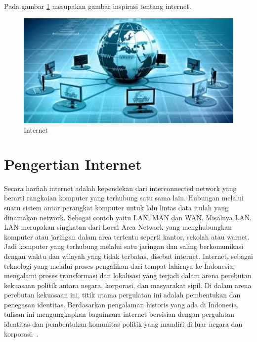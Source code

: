 
Pada gambar \ref{labelgambar} merupakan gambar inspirasi tentang internet.
\begin{figure}[ht]
\centerline{\includegraphics[width=1\textwidth]{figures/1internet.JPG}}
\caption{Internet}
\label{labelgambar}
\end{figure}

\section{Pengertian Internet}
\paragraph{} Secara harfiah internet adalah kependekan dari interconnected network yang berarti rangkaian komputer yang terhubung satu sama lain. Hubungan melalui suatu sistem antar perangkat komputer untuk lalu lintas data itulah yang dinamakan network. Sebagai contoh yaitu LAN, MAN dan WAN. Misalnya LAN. LAN merupakan singkatan dari Local Area Network yang menghubungkan komputer atau jaringan dalam area tertentu seperti kantor, sekolah atau warnet. Jadi komputer yang terhubung melalui satu jaringan dan saling berkomunikasi dengan waktu dan wilayah yang tidak terbatas, disebut internet.
Internet, sebagai teknologi yang melalui proses pengalihan dari tempat lahirnya ke Indonesia, mengalami proses transformasi dan lokalisasi yang terjadi dalam arena perebutan kekuasaan politik antara negara, korporasi, dan masyarakat sipil. Di dalam arena perebutan kekuasaan ini, titik utama pergulatan ini adalah pembentukan dan penegasan identitas. Berdasarkan pengalaman historis yang ada di Indonesia, tulisan ini mengungkapkan bagaimana internet bersisian dengan pergulatan identitas dan pembentukan komunitas politik yang mandiri di luar negara dan korporasi.
\cite{darma2009buku}.

